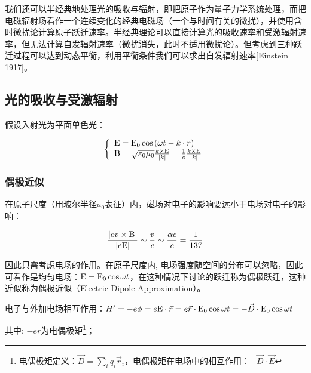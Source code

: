 我们还可以半经典地处理光的吸收与辐射，即把原子作为量子力学系统处理，而把电磁辐射场看作一个连续变化的经典电磁场（一个与时间有关的微扰），并使用含时微扰论计算原子跃迁速率。半经典理论可以直接计算光的吸收速率和受激辐射速率，但无法计算自发辐射速率（微扰消失，此时不适用微扰论）。但考虑到三种跃迁过程可以达到动态平衡，利用平衡条件我们可以求出自发辐射速率[Einstein 1917]。

\subsection{光的吸收与受激辐射}

假设入射光为平面单色光：

\begin{equation}\label{25-1}
\left\{ \begin{array}{l}
 {\rm E} = {\rm E}_0 \cos \left( {\omega t - k \cdot r} \right) \\
 {\rm B} = \sqrt {\varepsilon _0 \mu _0 } \frac{{k \times {\rm E}}}{{\left| k \right|}} = \frac{1}{c}\frac{{k \times {\rm E}}}{{\left| k \right|}} \\
 \end{array} \right.
\end{equation}

\subsubsection{偶极近似}

在原子尺度（用玻尔半径$a_0$表征）内，磁场对电子的影响要远小于电场对电子的影响：

\begin{equation}\label{25-2}
\frac{{\left| {ev \times {\rm B}} \right|}}{{\left| {e{\rm E}} \right|}} \sim \frac{v}{c} \sim \frac{{\alpha c}}{c} = \frac{1}{{137}}
\end{equation}

因此只需考虑电场的作用。在原子尺度内,
电场强度随空间的分布可以忽略，因此可看作是均匀电场：${\rm E} = {\rm
E}_0 \cos \omega
t$，在这种情况下讨论的跃迁称为偶极跃迁，这种近似称为偶极近似（Electric Dipole Approximation）。

电子与外加电场相互作用：$H' =  - e\phi  = e{\rm E} \cdot {\vec r} =
e {\vec r} \cdot {\rm E}_0 \cos \omega t =  - {\vec D} \cdot {\rm
E}_0 \cos \omega t$


其中: $ - er$为电偶极矩\footnote{电偶极矩定义：$\vec D =
\sum\limits_i {q_i {\vec r_i} } $，电偶极矩在电场中的相互作用：$ -
\vec D \cdot \vec E$}；




